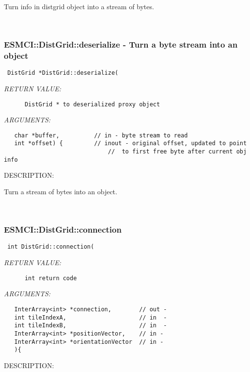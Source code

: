       Turn info in distgrid object into a stream of bytes.
   
 
\mbox{}\hrulefill\
 
\subsubsection [ESMCI::DistGrid::deserialize] {ESMCI::DistGrid::deserialize - Turn a byte stream into an object}


  
\begin{verbatim} DistGrid *DistGrid::deserialize(\end{verbatim}{\em RETURN VALUE:}
\begin{verbatim}      DistGrid * to deserialized proxy object\end{verbatim}{\em ARGUMENTS:}
\begin{verbatim}   char *buffer,          // in - byte stream to read
   int *offset) {         // inout - original offset, updated to point 
                              //  to first free byte after current obj info\end{verbatim}
{\sf DESCRIPTION:\\ }


      Turn a stream of bytes into an object.
   
 
\mbox{}\hrulefill\
 
\subsubsection [ESMCI::DistGrid::connection] {ESMCI::DistGrid::connection}


  
\begin{verbatim} int DistGrid::connection(\end{verbatim}{\em RETURN VALUE:}
\begin{verbatim}      int return code\end{verbatim}{\em ARGUMENTS:}
\begin{verbatim}   InterArray<int> *connection,        // out -
   int tileIndexA,                     // in  -
   int tileIndexB,                     // in  -
   InterArray<int> *positionVector,    // in -
   InterArray<int> *orientationVector  // in -
   ){    \end{verbatim}
{\sf DESCRIPTION:\\ }


